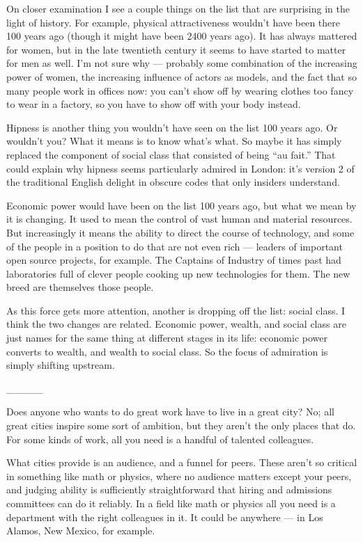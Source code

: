 On closer examination I see a couple things on the list that are
surprising in the light of history. For example, physical attractiveness
wouldn't have been there 100 years ago (though it might have been 2400
years ago). It has always mattered for women, but in the late twentieth
century it seems to have started to matter for men as well. I'm not sure
why --- probably some combination of the increasing power of women, the
increasing influence of actors as models, and the fact that so many
people work in offices now: you can't show off by wearing clothes too
fancy to wear in a factory, so you have to show off with your body
instead.

Hipness is another thing you wouldn't have seen on the list 100 years
ago. Or wouldn't you? What it means is to know what's what. So maybe it
has simply replaced the component of social class that consisted of
being ``au fait.'' That could explain why hipness seems particularly
admired in London: it's version 2 of the traditional English delight in
obscure codes that only insiders understand.

Economic power would have been on the list 100 years ago, but what we
mean by it is changing. It used to mean the control of vast human and
material resources. But increasingly it means the ability to direct the
course of technology, and some of the people in a position to do that
are not even rich --- leaders of important open source projects, for
example. The Captains of Industry of times past had laboratories full of
clever people cooking up new technologies for them. The new breed are
themselves those people.

As this force gets more attention, another is dropping off the list:
social class. I think the two changes are related. Economic power,
wealth, and social class are just names for the same thing at different
stages in its life: economic power converts to wealth, and wealth to
social class. So the focus of admiration is simply shifting upstream.

\_\_\_\_\_

Does anyone who wants to do great work have to live in a great city? No;
all great cities inspire some sort of ambition, but they aren't the only
places that do. For some kinds of work, all you need is a handful of
talented colleagues.

What cities provide is an audience, and a funnel for peers. These aren't
so critical in something like math or physics, where no audience matters
except your peers, and judging ability is sufficiently straightforward
that hiring and admissions committees can do it reliably. In a field
like math or physics all you need is a department with the right
colleagues in it. It could be anywhere --- in Los Alamos, New Mexico,
for example.

